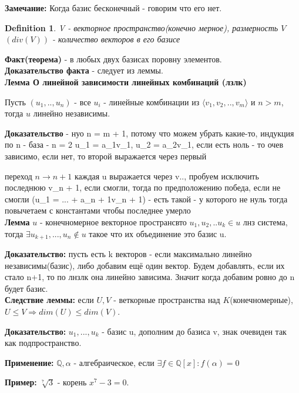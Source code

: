 \documentclass[12pt]{article}
\newtheorem{definition}{Definition}
\begin{document}
\textbf{Замечание: }Когда базис бесконечный - говорим что его нет.

\begin{definition}
    V - векторное пространство(конечно мерное), размерность $V$ $(div(V))$ - количество векторов в его базисе 
\end{definition} 


\textbf{Факт(теорема)} - в любых двух базисах поровну элементов. 
\\

\textbf{Доказательство факта} - следует из леммы.
\\

\textbf{Лемма О линейной зависимости линейных комбинаций  (лзлк)}

Пусть $(u_1, .., u_n)$ - все $u_i$ - линейные комбинации из $\langle v_1, v_2, .. , v_m\rangle$ и $n > m$, тогда $u$ линейно независимы.

\textbf{Доказательство} - нуо n = m + 1, потому что можем убрать какие-то, индукция по n - база - n = 2 u_1 = a_1v_1, u_2 = a_2v_1, если есть ноль - то очев зависимо, если нет, то второй выражается через первый

переход $n \rightarrow n + 1$ каждая u выражается через v.., пробуем исключить последнюю v_{n + 1}, если смогли, тогда по предположению победа, если не смогли (u_1 = ... + a_{n + 1}v_{n + 1}) - есть такой - у которого не нуль тогда повычетаем с константами чтобы последнее умерло 
\\

\textbf{Лемма}  $u$ - конечномерное векторное пространсвто $u_1, u_2, .. u_k \in u$ лнз система, тогда $\exists u_{k + 1}, ..., u_n \notin u$ такое что их объединение это базис u.

\textbf{Доказательство:} пусть есть k векторов - если максимально линейно независимы(базис), либо добавим ещё один вектор. Будем добавлять, если их стало n+1, то по лнзлк она линейно зависима. Значит когда добавим ровно до n будет базис.
\\

\textbf{Следствие леммы:} если $U, V$ - веткорные пространства над $K$(конечномерные), $U \leq V \Rightarrow dim(U) \leq dim(V)$.

\textbf{Доказательство:} $u_1, ..., u_k$ - базис u, дополним до базиса v, знак очевиден так как подпространство.

\textbf{Применение:} $\mathbb{Q}, \alpha$ - алгебраическое, если $\exists f \in \mathbb{Q}[x]: f(\alpha) = 0$

\textbf{Пример:} $\sqrt[7]{3}$ - корень $x^7 - 3 = 0$. 
\\
\end{document}
